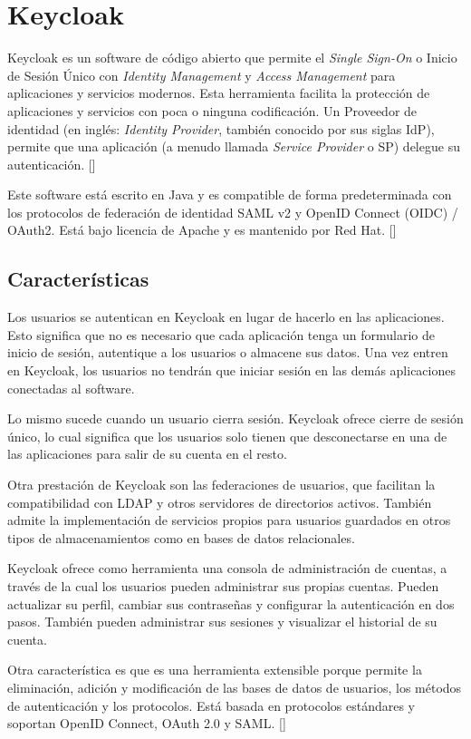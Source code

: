 \section{Keycloak}
Keycloak es un software de código abierto que permite el \textit{Single Sign-On} o Inicio de Sesión Único con \textit{Identity Management} y \textit{Access Management} para aplicaciones y servicios modernos. Esta herramienta facilita la protección de aplicaciones y servicios con poca o ninguna codificación. Un Proveedor de identidad (en inglés: \textit{Identity Provider}, también conocido por sus siglas IdP), permite que una aplicación (a menudo llamada \textit{Service Provider} o SP) delegue su autenticación. [\cite{KeycloakDoc}]

Este software está escrito en Java y es compatible de forma predeterminada con los protocolos de federación de identidad SAML v2 y OpenID Connect (OIDC) / OAuth2. Está bajo licencia de Apache y es  mantenido por Red Hat. [\cite{KeycloakDoc}]

	\subsection{Características}
	Los usuarios se autentican en Keycloak en lugar de hacerlo en las aplicaciones. Esto significa que no es necesario que cada aplicación tenga un formulario de inicio de sesión, autentique a los usuarios o almacene sus datos. Una vez entren en Keycloak, los usuarios no tendrán que iniciar sesión en las demás aplicaciones conectadas al software.
	
	Lo mismo sucede cuando un usuario cierra sesión. Keycloak ofrece cierre de sesión único, lo cual significa que los usuarios solo tienen que desconectarse en una de las aplicaciones para salir de su cuenta en el resto. 
	
	Otra prestación de Keycloak son las federaciones de usuarios, que facilitan la compatibilidad con LDAP y otros servidores de directorios activos. También admite la implementación de servicios propios para usuarios guardados en otros tipos de almacenamientos como en bases de datos relacionales. 
	
	Keycloak ofrece como herramienta una consola de administración de cuentas, a través de la cual los usuarios pueden administrar sus propias cuentas. Pueden actualizar su perfil, cambiar sus contraseñas y configurar la autenticación en dos pasos. También pueden administrar sus sesiones y visualizar el historial de su cuenta. 
	
	Otra característica es que es una herramienta extensible porque permite la eliminación, adición y modificación de las bases de datos de usuarios, los métodos de autenticación y los protocolos. Está basada en protocolos estándares y soportan OpenID Connect, OAuth 2.0 y SAML. [\cite{KeycloakDoc}]
	
